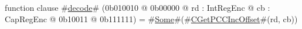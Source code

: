 function clause #\hyperref[zdecode]{decode}# (0b010010 @ 0b00000 @ rd : IntRegEnc @ cb : CapRegEnc @   0b10011 @ 0b111111) = #\hyperref[zSome]{Some}#(#\hyperref[zCGetPCCIncOffset]{CGetPCCIncOffset}#(rd, cb))

